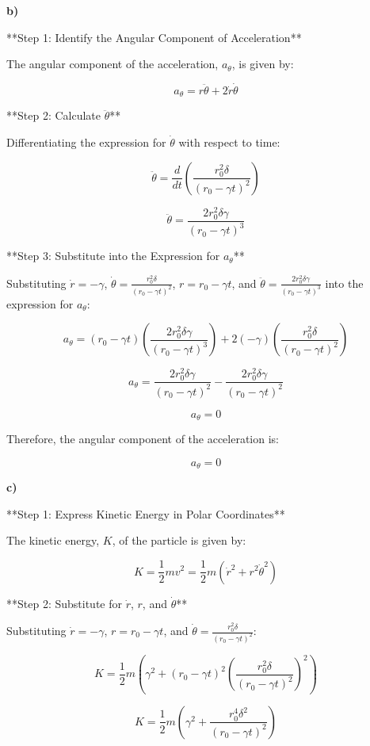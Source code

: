 \documentclass{article}
\begin{document}
\textbf{b)}

**Step 1: Identify the Angular Component of Acceleration**

The angular component of the acceleration, $a_{\theta}$, is given by:

\[a_{\theta} = r\ddot{\theta} + 2\dot{r}\dot{\theta}\]

**Step 2: Calculate $\ddot{\theta}$**

Differentiating the expression for $\dot{\theta}$ with respect to time:

\[\ddot{\theta} = \frac{d}{dt}\left(\frac{r_0^2\delta}{(r_0 - \gamma t)^2}\right)\]

\[\ddot{\theta} = \frac{2r_0^2\delta\gamma}{(r_0 - \gamma t)^3}\]

**Step 3: Substitute into the Expression for $a_{\theta}$**

Substituting $\dot{r} = -\gamma$, $\dot{\theta} = \frac{r_0^2\delta}{(r_0 - \gamma t)^2}$, $r = r_0 - \gamma t$, and $\ddot{\theta} = \frac{2r_0^2\delta\gamma}{(r_0 - \gamma t)^3}$ into the expression for $a_{\theta}$:

\[a_{\theta} = (r_0 - \gamma t)\left(\frac{2r_0^2\delta\gamma}{(r_0 - \gamma t)^3}\right) + 2(-\gamma)\left(\frac{r_0^2\delta}{(r_0 - \gamma t)^2}\right)\]

\[a_{\theta} = \frac{2r_0^2\delta\gamma}{(r_0 - \gamma t)^2} - \frac{2r_0^2\delta\gamma}{(r_0 - \gamma t)^2}\]

\[a_{\theta} = 0\]

Therefore, the angular component of the acceleration is:

\[\boxed{a_{\theta} = 0}\]

\textbf{c)}

**Step 1: Express Kinetic Energy in Polar Coordinates**

The kinetic energy, $K$, of the particle is given by:

\[K = \frac{1}{2}mv^2 = \frac{1}{2}m(\dot{r}^2 + r^2\dot{\theta}^2)\]

**Step 2: Substitute for $\dot{r}$, $r$, and $\dot{\theta}$**

Substituting $\dot{r} = -\gamma$, $r = r_0 - \gamma t$, and $\dot{\theta} = \frac{r_0^2\delta}{(r_0 - \gamma t)^2}$:

\[K = \frac{1}{2}m\left(\gamma^2 + (r_0 - \gamma t)^2\left(\frac{r_0^2\delta}{(r_0 - \gamma t)^2}\right)^2\right)\]

\[K = \frac{1}{2}m\left(\gamma^2 + \frac{r_0^4\delta^2}{(r_0 - \gamma t)^2}\right)\]
\end{document}
